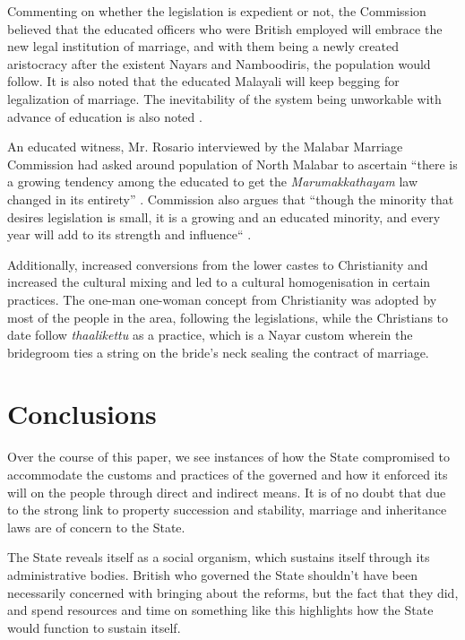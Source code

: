 \documentclass[a4paper]{article}
\begin{document}
Commenting on whether the legislation is expedient
or not, the Commission believed that the educated
officers who were British employed will embrace
the new legal institution of marriage, and with
them being a newly created aristocracy after the
existent Nayars and Namboodiris, the population
would follow. It is also noted that
\cite[74]{menon1894report} the educated Malayali
will keep begging for legalization of marriage.
The inevitability of the system being unworkable
with advance of education is also noted
\cite[61]{menon1894report}.

An educated witness, Mr. Rosario interviewed by
the Malabar Marriage Commission had asked around
population of North Malabar to ascertain ``there
is a growing tendency among the educated to get
the \emph{Marumakkathayam} law changed in its
entirety'' \cite[59]{menon1894report}. Commission
also argues that ``though the minority that desires
legislation is small, it is a growing and an
educated minority, and every year will add to its
strength and influence``
\cite[60]{menon1894report}.

Additionally, increased conversions from the lower
castes to Christianity and increased the cultural
mixing and led to a cultural homogenisation in
certain practices. The one-man one-woman concept
from Christianity was adopted by most of the
people in the area, following the legislations,
while the Christians to date follow
\emph{thaalikettu} as a practice, which is a Nayar
custom\cite[14]{menon1894report} wherein the
bridegroom ties a string on the bride's neck
sealing the contract of marriage.

\section{Conclusions}

Over the course of this paper, we see instances of
how the State compromised to accommodate the
customs and practices of the governed and how it
enforced its will on the people through direct and
indirect means. It is of no doubt that due to the
strong link to property succession and stability,
marriage and inheritance laws are of concern to
the State.

The State reveals itself as a social organism, which
sustains itself through its administrative bodies.
British who governed the State shouldn't have been
necessarily concerned with bringing about the
reforms, but the fact that they did, and spend
resources and time on something like this
highlights how the State would function to sustain
itself.
\end{document}
